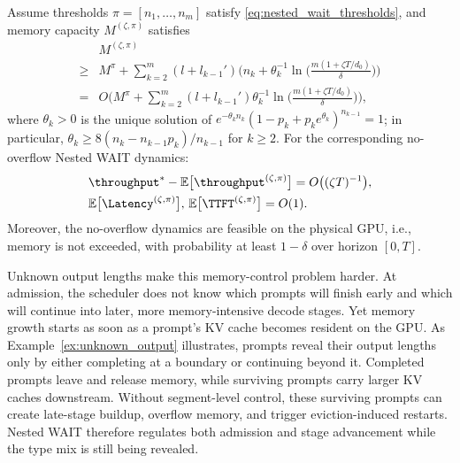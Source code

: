 \begin{theorem}
\label{thm:nested_wait_heavy_traffic}
Assume thresholds \( \pi = [n_1, \dots, n_m] \) satisfy \eqref{eq:nested_wait_thresholds}, and memory capacity \(M^{(\zeta,\pi)}\) satisfies
\begin{equation}
    \label{eq:nested_wait_memory_total}
\begin{aligned}
    &M^{(\zeta,\pi)}\\
\geq &M^\pi + \sum_{k=2}^m (l + l_{k-1}') \bigg(n_k + \theta_k^{-1} \ln\Big( \frac{m(1+\zeta T/d_0)}{\delta} \Big)\bigg) \\
=& O\bigg( M^\pi + \sum_{k=2}^m (l + l_{k-1}') \theta_k^{-1}\ln\Big( \frac{m(1+\zeta T/d_0)}{\delta} \Big) \bigg),
\end{aligned}
\end{equation}
where $\theta_k>0$ is the unique solution of \(e^{-\theta_k n_k}(1-p_k+p_ke^{\theta_k})^{n_{k-1}}=1\); in particular, $\theta_k \geq 8(n_k - n_{k-1}p_k)/n_{k-1}$ for \(k\ge 2\). For the corresponding no-overflow Nested WAIT dynamics:
$$
    \begin{aligned}
        &\throughput^* - \mathbb{E}\big[ \throughput^{(\zeta, \pi)} \big] 
   = O\big( (\zeta T)^{-1} \big), \\
&\mathbb{E}\big[ \Latency^{(\zeta, \pi)} \big],\,\mathbb{E}\big[ \TTFT^{(\zeta, \pi)} \big] = O(1).
    \end{aligned}
$$
Moreover, the no-overflow dynamics are feasible on the physical GPU, i.e., memory is not exceeded, with probability at least \(1-\delta\) over horizon \([0,T]\).
\end{theorem}

Unknown output lengths make this memory-control problem harder. At admission, the scheduler does not know which prompts will finish early and which will continue into later, more memory-intensive decode stages. Yet memory growth starts as soon as a prompt's KV cache becomes resident on the GPU. As Example~\ref{ex:unknown_output} illustrates, prompts reveal their output lengths only by either completing at a boundary or continuing beyond it. Completed prompts leave and release memory, while surviving prompts carry larger KV caches downstream. Without segment-level control, these surviving prompts can create late-stage buildup, overflow memory, and trigger eviction-induced restarts. Nested WAIT therefore regulates both admission and stage advancement while the type mix is still being revealed.


